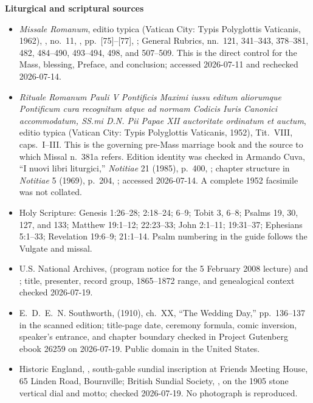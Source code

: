 \textbf{Liturgical and scriptural sources}
{\fontsize{8.3}{9.2}\selectfont
\begin{itemize}[itemsep=0em,topsep=0.15em,parsep=0pt]
\item \emph{Missale Romanum}, editio typica (Vatican City: Typis Polyglottis Vaticanis, 1962), , no.~11, , pp.~[75]--[77], ; General Rubrics, nn.~121, 341--343, 378--381, 482, 484--490, 493--494, 498, and 507--509. This is the direct control for the Mass, blessing, Preface, and conclusion; accessed 2026-07-11 and rechecked 2026-07-14.
\item \emph{Rituale Romanum Pauli V Pontificis Maximi iussu editum aliorumque Pontificum cura recognitum atque ad normam Codicis Iuris Canonici accommodatum, SS.mi D.N. Pii Papae XII auctoritate ordinatum et auctum}, editio typica (Vatican City: Typis Polyglottis Vaticanis, 1952), Tit.~VIII, caps.~I--III. This is the governing pre-Mass marriage book and the source to which Missal n.~381a refers. Edition identity was checked in Armando Cuva, ``I nuovi libri liturgici,'' \emph{Notitiae} 21 (1985), p.~400, ; chapter structure in \emph{Notitiae} 5 (1969), p.~204, ; accessed 2026-07-14. A complete 1952 facsimile was not collated.
\item Holy Scripture: Genesis 1:26--28; 2:18--24; 6--9; Tobit 3, 6--8; Psalms 19, 30, 127, and 133; Matthew 19:1--12; 22:23--33; John 2:1--11; 19:31--37; Ephesians 5:1--33; Revelation 19:6--9; 21:1--14. Psalm numbering in the guide follows the Vulgate and missal.
\item U.S. National Archives,  (program notice for the 5 February 2008 lecture) and ; title, presenter, record group, 1865--1872 range, and genealogical context checked 2026-07-19.
\item E.~D.~E.~N. Southworth,  (1910), ch.~XX, ``The Wedding Day,'' pp.~136--137 in the scanned edition; title-page date, ceremony formula, comic inversion, speaker's entrance, and chapter boundary checked in Project Gutenberg ebook 26259 on 2026-07-19. Public domain in the United States.
\item Historic England, , south-gable sundial inscription at Friends Meeting House, 65 Linden Road, Bournville; British Sundial Society, , on the 1905 stone vertical dial and motto; checked 2026-07-19. No photograph is reproduced.
\end{itemize}
}

